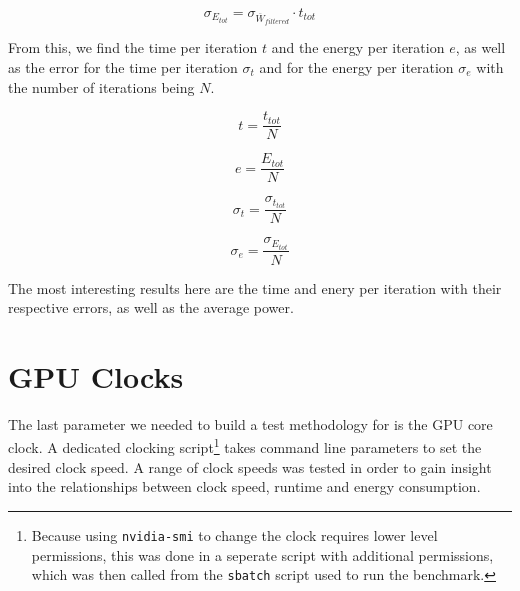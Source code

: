\begin{equation}
\sigma_{E_{tot}} = \sigma_{\overline{W}_{filtered}} \cdot t_{tot}
\end{equation}

From this, we find the time per iteration \( t \) and the energy per iteration \( e \), as well as the error for the time per iteration \( \sigma_t \) and for the energy per iteration \( \sigma_e \) with the number of iterations being \( N \).

\begin{equation}
t = \frac{t_{tot}}{N}
\end{equation}

\begin{equation}
e = \frac{E_{tot}}{N}
\end{equation}

\begin{equation}
\sigma_t = \frac{\sigma_{t_{tot}}}{N}
\end{equation}

\begin{equation}
\sigma_e = \frac{\sigma_{E_{tot}}}{N}
\end{equation}

The most interesting results here are the time and enery per iteration with their respective errors, as well as the average power.


\section{GPU Clocks}
The last parameter we needed to build a test methodology for is the GPU core clock. A dedicated clocking script\footnote{Because using \texttt{nvidia-smi} to change the clock requires lower level permissions, this was done in a seperate script with additional permissions, which was then called from the \texttt{sbatch} script used to run the benchmark.} takes command line parameters to set the desired clock speed. A range of clock speeds was tested in order to gain insight into the relationships between clock speed, runtime and energy consumption.